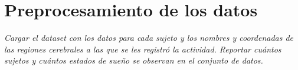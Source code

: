 \documentclass{article}
\begin{document}
\section{Preprocesamiento de los datos}

\textit{Cargar el dataset con los datos para cada sujeto y los nombres y coordenadas 
de las regiones cerebrales a las que se les registró la actividad. Reportar cuántos sujetos y cuántos estados de sueño se observan en el conjunto de
datos.}

\printbibliography
\end{document}

